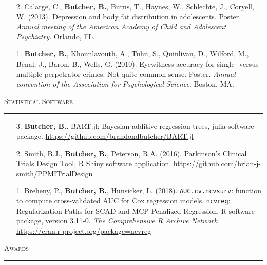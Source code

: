 \documentclass[a4paper]{article}
\begin{document}
\begin{enumerate}
  \item[2.] Calarge, C., \textbf{Butcher, B.}, Burns, T., Haynes, W., Schlechte,
    J., Coryell, W. (2013). Depression and body fat distribution in adolescents.
    Poster. \textit{Annual meeting of the American Academy of Child and Adolescent
    Psychiatry}. Orlando, FL.

  \item[1.] \textbf{Butcher, B.}, Khounlavouth, A., Tuhn, S., Quinlivan, D.,
    Wilford, M., Benal, J., Baron, B., Wells, G. (2010). Eyewitness accuracy for
    single- versus multiple-perpetrator crimes: Not quite common sense. Poster.
    \textit{Annual convention of the Association for Psychological Science}.
    Boston, MA.

\end{enumerate}

\begin{flushleft}
  \Large\textsc{Statistical Software}
  \textcolor{usafagrey}{\rule[0.5\baselineskip]{\textwidth}{0.75pt}}
\end{flushleft}
\vspace{-1.5\baselineskip}

\begin{enumerate}
  \item[3.] \textbf{Butcher, B.}. BART.jl: Bayesian
    additive regression trees, julia software package.
    \url{https://github.com/brandondbutcher/BART.jl}
  \item[2.] Smith, B.J., \textbf{Butcher, B.}, Peterson, R.A. (2016).
    Parkinson's Clinical Trials Design Tool, R Shiny software application.
    \url{https://github.com/brian-j-smith/PPMITrialDesign}
  \item[1.] Breheny, P., \textbf{Butcher, B.}, Hunsicker, L. (2018).
    \texttt{AUC.cv.ncvsurv}: function to compute cross-validated
    AUC for Cox regression models. \texttt{ncvreg}: Regularization Paths for SCAD
    and MCP Penalized Regression, R software package, version 3.11-0.
    \textit{The Comprehensive R Archive Network}.
    \url{https://cran.r-project.org/package=ncvreg}
\end{enumerate}


\begin{flushleft}
  \Large\textsc{Awards}
  \textcolor{usafagrey}{\rule[0.5\baselineskip]{\textwidth}{0.75pt}}
\end{flushleft}
\vspace{-\baselineskip}
\end{document}

